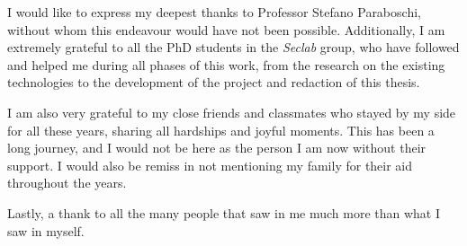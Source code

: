 I would like to express my deepest thanks to Professor Stefano Paraboschi, without whom
this endeavour would have not been possible.
Additionally, I am extremely grateful to all the PhD students in the \textit{Seclab} group,
who have followed and helped me during all phases of this work, from the research on
the existing technologies to the development of the project and redaction of this thesis.

I am also very grateful to my close friends and classmates who stayed by my side
for all these years, sharing all hardships and joyful moments.
This has been a long journey, and I would not be here as the person I am now
without their support.
I would also be remiss in not mentioning my family for their aid throughout the years.

Lastly, a thank to all the many people that saw in me much more than what I saw in myself.